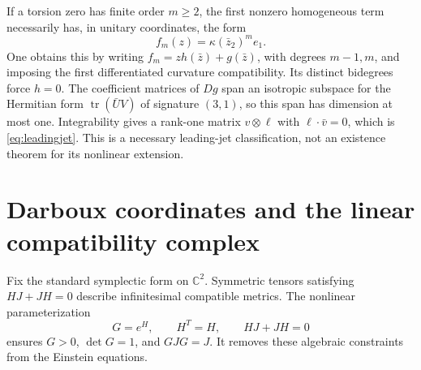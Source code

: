 \documentclass[11pt,a4paper]{article}
\theoremstyle{definition}
\theoremstyle{remark}
\newcommand{\tr}{\operatorname{tr}}
\newcommand{\C}{\mathbb C}
\begin{document}
If a torsion zero has finite order $m\ge2$, the first nonzero homogeneous term necessarily has, in unitary coordinates, the form
\begin{equation}\label{eq:leadingjet}
 f_m(z)=\kappa(\bar z_2)^m e_1.
\end{equation}
One obtains this by writing $f_m=z h(\bar z)+g(\bar z)$, with degrees $m-1,m$, and imposing the first differentiated curvature compatibility. Its distinct bidegrees force $h=0$. The coefficient matrices of $Dg$ span an isotropic subspace for the Hermitian form $\tr(\bar U V)$ of signature $(3,1)$, so this span has dimension at most one. Integrability gives a rank-one matrix $v\otimes\ell$ with $\ell\cdot\bar v=0$, which is \eqref{eq:leadingjet}. This is a necessary leading-jet classification, not an existence theorem for its nonlinear extension.

\section{Darboux coordinates and the linear compatibility complex}
Fix the standard symplectic form on $\C^2$. Symmetric tensors satisfying $HJ+JH=0$ describe infinitesimal compatible metrics. The nonlinear parameterization
\begin{equation}\label{eq:expmetric}
 G=e^H,\qquad H^T=H,\qquad HJ+JH=0
\end{equation}
ensures $G>0$, $\det G=1$, and $GJG=J$. It removes these algebraic constraints from the Einstein equations.
\end{document}
